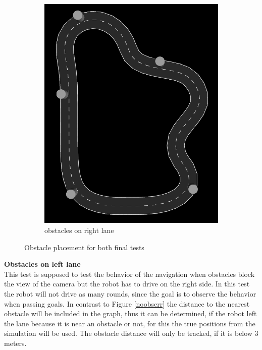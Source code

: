 \begin{figure}[H]
\begin{subfigure}{.5\linewidth}
		\includegraphics[width=\textwidth]{Pictures/right final obs}
		\caption{obstacles on right lane}
	\end{subfigure}

	\caption{Obstacle placement for both final tests}
	\label{obstaclefinaltest}

\end{figure}
\textbf{Obstacles on left lane}\\
This test is supposed to test the behavior of the navigation when obstacles block the view of the camera but the robot has to drive on the right side. In this test the robot will not drive as many rounds, since the goal is to observe the behavior when passing goals. In contrast to Figure \ref{noobserr} the distance to the nearest obstacle will be included in the graph, thus it can be determined, if the robot left the lane because it is near an obstacle or not, for this the true positions from the simulation will be used. The obstacle distance will only be tracked, if it is below 3 meters.
